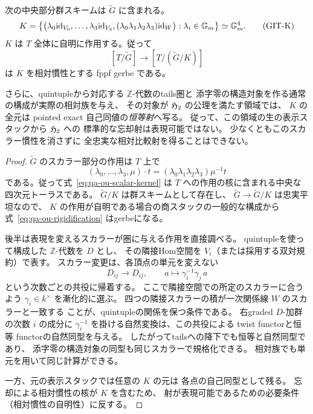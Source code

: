 \begin{proposition}[生のquintuple表示の四次元スカラー核]
\label{prop:qa-ou-scalar-gerbe}
次の中央部分群スキームは $\widetilde G$ に含まれる。
\[
 K=\left\{
 \bigl(\lambda_0\mathrm{id}_{V_0},\ldots,
       \lambda_3\mathrm{id}_{V_3},
       (\lambda_0\lambda_1\lambda_2\lambda_3)\mathrm{id}_{W}\bigr)
 :\lambda_i\in\mathbb G_m
 \right\}\simeq\mathbb G_m^4.
 \tag{GIT-K}\label{eq:qa-ou-scalar-kernel}
\]
$K$ は $T$ 全体に自明に作用する。従って
\[
 [T/\widetilde G]\longrightarrow[T/(\widetilde G/K)]
 \tag{GIT-rig}\label{eq:qa-ou-rigidification}
\]
は $K$ を相対慣性とする fppf gerbe である。

さらに、quintupleから対応する $\mathbb Z$-代数のtails圏と
添字零の構造対象を作る通常の構成が実際の相対族を与え、
その対象が $\mathfrak H_2$ の公理を満たす領域では、
$K$ の全元は pointed exact 自己同値の\emph{恒等射}へ写る。
従って、この領域の生の表示スタックから $\mathfrak H_2$ への
標準的な忘却射は表現可能ではない。
少なくともこのスカラー慣性を消さずに
全忠実な相対比較射を得ることはできない。
\end{proposition}
\begin{proof}
$\widetilde G$ のスカラー部分の作用は
$T$ 上で
\[
 (\lambda_0,\ldots,\lambda_3,\mu)\cdot t
   =(\lambda_0\lambda_1\lambda_2\lambda_3)\mu^{-1}t
\]
である。従って式~\eqref{eq:qa-ou-scalar-kernel} は
$T$ への作用の核に含まれる中央な四次元トーラスである。
$\widetilde G/K$ は群スキームとして存在し、
$\widetilde G\to\widetilde G/K$ は忠実平坦なので、
$K$ の作用が自明である場合の商スタックの一般的な構成から
式~\eqref{eq:qa-ou-rigidification} はgerbeになる。

後半は表現を変えるスカラーが圏に与える作用を直接調べる。
quintupleを使って構成した $\mathbb Z$-代数を $D$ とし、
その隣接Hom空間を $V_i$（または採用する双対規約）で表す。
スカラー変更は、各頂点の単元を変えない
\[
 D_{ij}\longrightarrow D_{ij},\qquad
 a\longmapsto\gamma_i^{-1}\gamma_j\,a
\]
という次数ごとの共役に帰着する。
ここで隣接空間での所定のスカラーに合うよう
$\gamma_i\in k^\times$ を漸化的に選ぶ。
四つの隣接スカラーの積が一次関係線 $W$ のスカラーと一致する
ことが、quintupleの関係を保つ条件である。
右graded $D$-加群の次数 $i$ の成分に
$\gamma_i^{-1}$ を掛ける自然変換は、この共役による
twist functorと恒等 functorの自然同型を与える。
したがってtailsへの降下でも恒等と自然同型であり、
添字零の構造対象の同型も同じスカラーで規格化できる。
相対族でも単元を用いて同じ計算ができる。

一方、元の表示スタックでは任意の $K$ の元は
各点の自己同型として残る。
忘却による相対慣性の核が $K$ を含むため、
射が表現可能であるための必要条件（相対慣性の自明性）に反する。
\end{proof}

